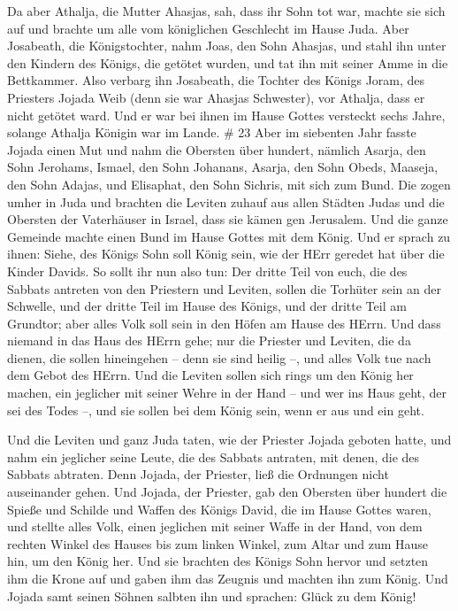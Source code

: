  Da aber Athalja, die Mutter Ahasjas, sah, dass ihr Sohn
tot war, machte sie sich auf und brachte um alle vom königlichen
Geschlecht im Hause Juda.  Aber Josabeath, die
Königstochter, nahm Joas, den Sohn Ahasjas, und stahl ihn unter den
Kindern des Königs, die getötet wurden, und tat ihn mit seiner Amme in
die Bettkammer. Also verbarg ihn Josabeath, die Tochter des Königs
Joram, des Priesters Jojada Weib (denn sie war Ahasjas Schwester), vor
Athalja, dass er nicht getötet ward.  Und er war bei ihnen
im Hause Gottes versteckt sechs Jahre, solange Athalja Königin war im
Lande. \# 23  Aber im siebenten Jahr fasste Jojada einen Mut
und nahm die Obersten über hundert, nämlich Asarja, den Sohn Jerohams,
Ismael, den Sohn Johanans, Asarja, den Sohn Obeds, Maaseja, den Sohn
Adajas, und Elisaphat, den Sohn Sichris, mit sich zum Bund. 
Die zogen umher in Juda und brachten die Leviten zuhauf aus allen
Städten Judas und die Obersten der Vaterhäuser in Israel, dass sie kämen
gen Jerusalem.  Und die ganze Gemeinde machte einen Bund im
Hause Gottes mit dem König. Und er sprach zu ihnen: Siehe, des Königs
Sohn soll König sein, wie der HErr geredet hat über die Kinder Davids.
 So sollt ihr nun also tun: Der dritte Teil von euch, die
des Sabbats antreten von den Priestern und Leviten, sollen die Torhüter
sein an der Schwelle,  und der dritte Teil im Hause des
Königs, und der dritte Teil am Grundtor; aber alles Volk soll sein in
den Höfen am Hause des HErrn.  Und dass niemand in das Haus
des HErrn gehe; nur die Priester und Leviten, die da dienen, die sollen
hineingehen -- denn sie sind heilig --, und alles Volk tue nach dem
Gebot des HErrn.  Und die Leviten sollen sich rings um den
König her machen, ein jeglicher mit seiner Wehre in der Hand -- und wer
ins Haus geht, der sei des Todes --, und sie sollen bei dem König sein,
wenn er aus und ein geht.

 Und die Leviten und ganz Juda taten, wie der Priester
Jojada geboten hatte, und nahm ein jeglicher seine Leute, die des
Sabbats antraten, mit denen, die des Sabbats abtraten. Denn Jojada, der
Priester, ließ die Ordnungen nicht auseinander gehen.  Und
Jojada, der Priester, gab den Obersten über hundert die Spieße und
Schilde und Waffen des Königs David, die im Hause Gottes waren,
 und stellte alles Volk, einen jeglichen mit seiner Waffe
in der Hand, von dem rechten Winkel des Hauses bis zum linken Winkel,
zum Altar und zum Hause hin, um den König her.  Und sie
brachten des Königs Sohn hervor und setzten ihm die Krone auf und gaben
ihm das Zeugnis und machten ihn zum König. Und Jojada samt seinen Söhnen
salbten ihn und sprachen: Glück zu dem König!

